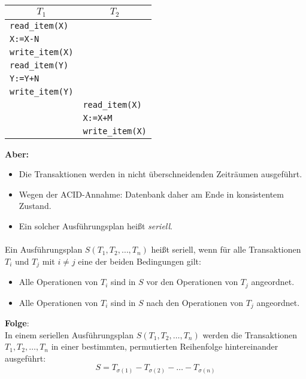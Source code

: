 \begin{frame}{\insertsection}
\framesubtitle{\insertsubsection}
{\small
	\begin{center}
		\begin{tabular}{p{3.0cm}|p{3.0cm}}
			\multicolumn{1}{c|}{$T_1$} & \multicolumn{1}{c}{$T_2$}\\\hline
			\texttt{read\_item(X)} & \\
			\texttt{X:=X-N} & \\ 
			\texttt{write\_item(X)} & \\
			\texttt{read\_item(Y)} & \\
			\texttt{Y:=Y+N} &\\
			\texttt{write\_item(Y)} & \\
			&  \texttt{read\_item(X)}\\
			&  \texttt{X:=X+M}\\
			&\texttt{write\_item(X)} \\\hline
		\end{tabular}
	\end{center}
}
\pause
\textbf{Aber:} 
\begin{itemize}
	\item Die Transaktionen werden in nicht \"uberschneidenden Zeitr\"aumen ausgef\"uhrt.
	\item Wegen der ACID-Annahme: Datenbank daher am Ende in konsistentem Zustand.
	\item Ein solcher Ausf\"uhrungsplan hei\ss t \textit{seriell}.
\end{itemize}
\end{frame}

\begin{frame}{\insertsection}
\framesubtitle{\insertsubsection}
\begin{definition}
	Ein Ausführungsplan $S(T_1,T_2,\dots ,T_n)$ hei\ss t seriell, wenn f\"ur alle Transaktionen $T_i$ und $T_j$ mit $i\ne j$ 
	eine der beiden Bedingungen gilt:
	\begin{itemize}
		\item Alle Operationen von $T_i$ sind in $S$ vor den Operationen von $T_j$ angeordnet.
		\item Alle Operationen von $T_i$ sind in $S$ nach den Operationen von $T_j$ angeordnet.
	\end{itemize}
\end{definition}
\nl
\pause
\textbf{Folge}:
\\[4pt]
In einem seriellen Ausführungsplan $S(T_1,T_2,\dots ,T_n)$ werden die Transaktionen $T_1,T_2,\dots ,T_n$ in einer bestimmten, 
permutierten Reihenfolge hintereinander ausgef\"uhrt: 
\begin{equation*}
S= T_{\sigma(1)}-T_{\sigma(2)}-\ldots -T_{\sigma(n)}
\end{equation*}
\end{frame}

